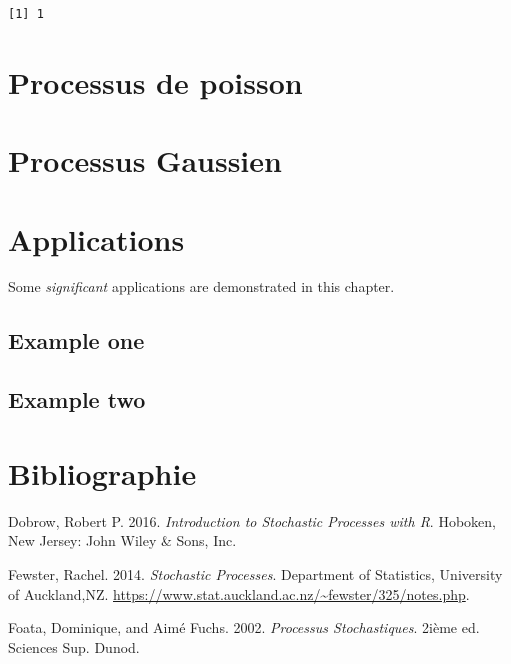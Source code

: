 \documentclass[
]{book}
\theoremstyle{definition}
\theoremstyle{definition}
\theoremstyle{definition}
\theoremstyle{remark}
\begin{document}
\begin{verbatim}
[1] 1
\end{verbatim}

\hypertarget{processus-de-poisson}{%
\chapter{Processus de poisson}\label{processus-de-poisson}}

\hypertarget{processus-gaussien}{%
\chapter{Processus Gaussien}\label{processus-gaussien}}

\hypertarget{applications}{%
\chapter{Applications}\label{applications}}

Some \emph{significant} applications are demonstrated in this chapter.

\hypertarget{example-one}{%
\section{Example one}\label{example-one}}

\hypertarget{example-two}{%
\section{Example two}\label{example-two}}

\hypertarget{bibliographie}{%
\chapter*{Bibliographie}\label{bibliographie}}

\hypertarget{refs}{}
\leavevmode\hypertarget{ref-Dobrow2016}{}%
Dobrow, Robert P. 2016. \emph{Introduction to Stochastic Processes with R}. Hoboken, New Jersey: John Wiley \& Sons, Inc.

\leavevmode\hypertarget{ref-rachel2012}{}%
Fewster, Rachel. 2014. \emph{Stochastic Processes}. Department of Statistics, University of Auckland,NZ. \url{https://www.stat.auckland.ac.nz/~fewster/325/notes.php}.

\leavevmode\hypertarget{ref-dominique2002}{}%
Foata, Dominique, and Aimé Fuchs. 2002. \emph{Processus Stochastiques}. 2ième ed. Sciences Sup. Dunod.
\end{document}

